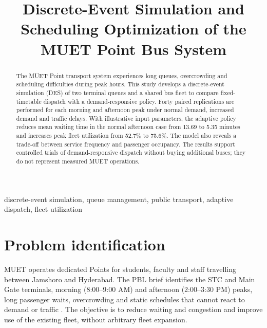\documentclass[conference]{IEEEtran}
\begin{document}
\title{Discrete-Event Simulation and Scheduling Optimization of the MUET Point Bus System}
\author{
}
\maketitle
\begin{abstract}
The MUET Point transport system experiences long queues, overcrowding and scheduling difficulties during peak hours. This study develops a discrete-event simulation (DES) of two terminal queues and a shared bus fleet to compare fixed-timetable dispatch with a demand-responsive policy. Forty paired replications are performed for each morning and afternoon peak under normal demand, increased demand and traffic delays. With illustrative input parameters, the adaptive policy reduces mean waiting time in the normal afternoon case from 13.69 to 5.35 minutes and increases peak fleet utilization from 52.7\% to 75.6\%. The model also reveals a trade-off between service frequency and passenger occupancy. The results support controlled trials of demand-responsive dispatch without buying additional buses; they do not represent measured MUET operations.
\end{abstract}
\begin{IEEEkeywords}
discrete-event simulation, queue management, public transport, adaptive dispatch, fleet utilization
\end{IEEEkeywords}
\section{Problem identification}
MUET operates dedicated Points for students, faculty and staff travelling between Jamshoro and Hyderabad. The PBL brief identifies the STC and Main Gate terminals, morning (8:00--9:00 AM) and afternoon (2:00--3:30 PM) peaks, long passenger waits, overcrowding and static schedules that cannot react to demand or traffic \cite{brief}. The objective is to reduce waiting and congestion and improve use of the existing fleet, without arbitrary fleet expansion.
\end{document}
